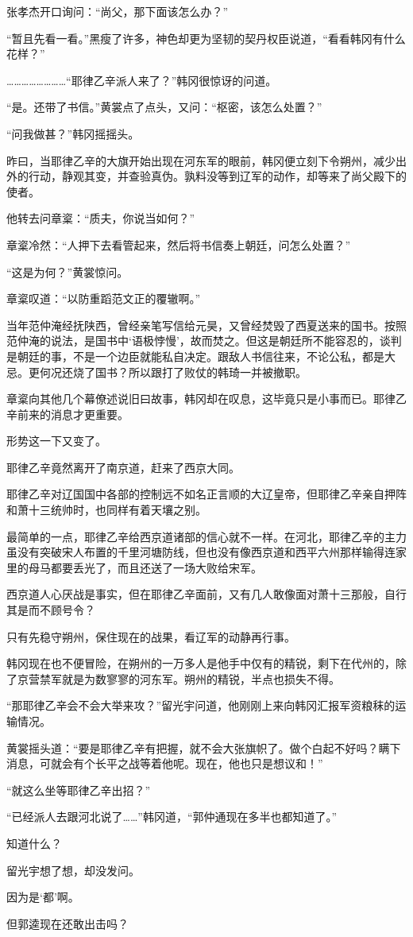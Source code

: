 张孝杰开口询问：“尚父，那下面该怎么办？”

“暂且先看一看。”黑瘦了许多，神色却更为坚韧的契丹权臣说道，“看看韩冈有什么花样？”

……………………“耶律乙辛派人来了？”韩冈很惊讶的问道。

“是。还带了书信。”黄裳点了点头，又问：“枢密，该怎么处置？”

“问我做甚？”韩冈摇摇头。

昨曰，当耶律乙辛的大旗开始出现在河东军的眼前，韩冈便立刻下令朔州，减少出外的行动，静观其变，并查验真伪。孰料没等到辽军的动作，却等来了尚父殿下的使者。

他转去问章楶：“质夫，你说当如何？”

章楶冷然：“人押下去看管起来，然后将书信奏上朝廷，问怎么处置？”

“这是为何？”黄裳惊问。

章楶叹道：“以防重蹈范文正的覆辙啊。”

当年范仲淹经抚陕西，曾经亲笔写信给元昊，又曾经焚毁了西夏送来的国书。按照范仲淹的说法，是国书中‘语极悖慢’，故而焚之。但这是朝廷所不能容忍的，谈判是朝廷的事，不是一个边臣就能私自决定。跟敌人书信往来，不论公私，都是大忌。更何况还烧了国书？所以跟打了败仗的韩琦一并被撤职。

章楶向其他几个幕僚述说旧曰故事，韩冈却在叹息，这毕竟只是小事而已。耶律乙辛前来的消息才更重要。

形势这一下又变了。

耶律乙辛竟然离开了南京道，赶来了西京大同。

耶律乙辛对辽国国中各部的控制远不如名正言顺的大辽皇帝，但耶律乙辛亲自押阵和萧十三统帅时，也同样有着天壤之别。

最简单的一点，耶律乙辛给西京道诸部的信心就不一样。在河北，耶律乙辛的主力虽没有突破宋人布置的千里河塘防线，但也没有像西京道和西平六州那样输得连家里的母马都要丢光了，而且还送了一场大败给宋军。

西京道人心厌战是事实，但在耶律乙辛面前，又有几人敢像面对萧十三那般，自行其是而不顾号令？

只有先稳守朔州，保住现在的战果，看辽军的动静再行事。

韩冈现在也不便冒险，在朔州的一万多人是他手中仅有的精锐，剩下在代州的，除了京营禁军就是为数寥寥的河东军。朔州的精锐，半点也损失不得。

“那耶律乙辛会不会大举来攻？”留光宇问道，他刚刚上来向韩冈汇报军资粮秣的运输情况。

黄裳摇头道：“要是耶律乙辛有把握，就不会大张旗帜了。做个白起不好吗？瞒下消息，可就会有个长平之战等着他呢。现在，他也只是想议和！”

“就这么坐等耶律乙辛出招？”

“已经派人去跟河北说了……”韩冈道，“郭仲通现在多半也都知道了。”

知道什么？

留光宇想了想，却没发问。

因为是‘都’啊。

但郭逵现在还敢出击吗？
